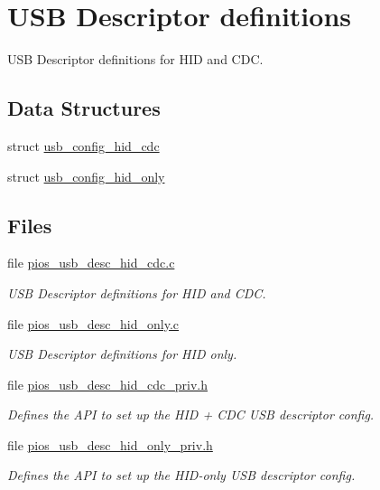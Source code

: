 \hypertarget{group___p_i_o_s___u_s_b___d_e_s_c}{\section{\-U\-S\-B \-Descriptor definitions}
\label{group___p_i_o_s___u_s_b___d_e_s_c}
}


\-U\-S\-B \-Descriptor definitions for \-H\-I\-D and \-C\-D\-C.  


\subsection*{\-Data \-Structures}
\begin{DoxyCompactItemize}
\item 
struct \hyperlink{structusb__config__hid__cdc}{usb\-\_\-config\-\_\-hid\-\_\-cdc}
\item 
struct \hyperlink{structusb__config__hid__only}{usb\-\_\-config\-\_\-hid\-\_\-only}
\end{DoxyCompactItemize}
\subsection*{\-Files}
\begin{DoxyCompactItemize}
\item 
file \hyperlink{pios__usb__desc__hid__cdc_8c}{pios\-\_\-usb\-\_\-desc\-\_\-hid\-\_\-cdc.\-c}
\begin{DoxyCompactList}\small\item\em \-U\-S\-B \-Descriptor definitions for \-H\-I\-D and \-C\-D\-C. \end{DoxyCompactList}\item 
file \hyperlink{pios__usb__desc__hid__only_8c}{pios\-\_\-usb\-\_\-desc\-\_\-hid\-\_\-only.\-c}
\begin{DoxyCompactList}\small\item\em \-U\-S\-B \-Descriptor definitions for \-H\-I\-D only. \end{DoxyCompactList}\item 
file \hyperlink{pios__usb__desc__hid__cdc__priv_8h}{pios\-\_\-usb\-\_\-desc\-\_\-hid\-\_\-cdc\-\_\-priv.\-h}
\begin{DoxyCompactList}\small\item\em \-Defines the \-A\-P\-I to set up the \-H\-I\-D + \-C\-D\-C \-U\-S\-B descriptor config. \end{DoxyCompactList}\item 
file \hyperlink{pios__usb__desc__hid__only__priv_8h}{pios\-\_\-usb\-\_\-desc\-\_\-hid\-\_\-only\-\_\-priv.\-h}
\begin{DoxyCompactList}\small\item\em \-Defines the \-A\-P\-I to set up the \-H\-I\-D-\/only \-U\-S\-B descriptor config. \end{DoxyCompactList}\end{DoxyCompactItemize}
